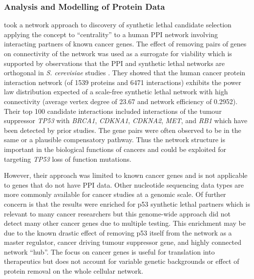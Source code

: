 \subsubsection{Analysis and Modelling of Protein Data}

\citet{Kranthi2013} took a network approach to discovery of synthetic lethal candidate selection applying the concept to ``centrality'' to a human PPI network involving interacting partners of known cancer genes. The effect of removing pairs of genes on connectivity of the network was used as a surrogate for viability which is supported by observations that the PPI and synthetic lethal networks are orthogonal in \textit{S. cerevisiae} studies \citep{Tong2004}. They showed that the human cancer protein interaction network (of 1539 proteins and 6471 interactions) exhibits the power law distribution expected of a scale-free synthetic lethal network with high connectivity (average vertex degree of 23.67 and network efficiency of 0.2952). Their top 100 candidate interactions included interactions of the tumour suppressor \textit{TP53} with \textit{BRCA1}, \textit{CDKNA1}, \textit{CDKNA2}, \textit{MET}, and \textit{RB1} which have been detected by prior studies. The gene pairs were often observed to be in the same or a plausible compensatory pathway. Thus the network structure is important in the biological functions of cancers and could be exploited for targeting \textit{TP53} loss of function mutations. 

However, their approach was limited to known cancer genes and is not applicable to genes that do not have PPI data. Other nucleotide sequencing data types are more commonly available for cancer studies at a genomic scale. Of further concern is that the results were enriched for p53 synthetic lethal partners which is relevant to many cancer researchers but this genome-wide approach did not detect many other cancer genes due to multiple testing. This enrichment may be due to the known drastic effect of removing p53 itself from the network as a master regulator, cancer driving tumour suppressor gene, and highly connected network ``hub''. The focus on cancer genes is useful for translation into therapeutics but does not account for variable genetic backgrounds or effect of protein removal on the whole cellular network.  

